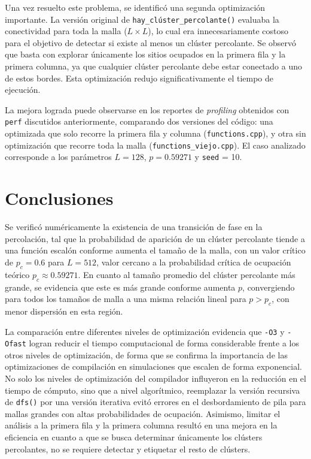 \documentclass[%
 reprint,
 amsmath,amssymb,
 aps,
]{revtex4-2}
\begin{document}
Una vez resuelto este problema, se identificó una segunda optimización importante. La versión original de \texttt{hay\_clúster\_percolante()} evaluaba la conectividad para toda la malla (\( L \times L \)), lo cual era innecesariamente costoso para el objetivo de detectar si existe al menos un clúster percolante. Se observó que basta con explorar únicamente los sitios ocupados en la primera fila y la primera columna, ya que cualquier clúster percolante debe estar conectado a uno de estos bordes. Esta optimización redujo significativamente el tiempo de ejecución.

La mejora lograda puede observarse en los reportes de \textit{profiling} obtenidos con \texttt{perf} discutidos anteriormente, comparando dos versiones del código: una optimizada que solo recorre la primera fila y columna (\texttt{functions.cpp}), y otra sin optimización que recorre toda la malla (\texttt{functions\_viejo.cpp}). El caso analizado corresponde a los parámetros \( L = 128 \), \( p = 0.59271 \) y \texttt{seed} = 10.


\section{Conclusiones}

Se verificó numéricamente la existencia de una transición de fase en la percolación, tal que la probabilidad de aparición de un clúster percolante tiende a una función escalón conforme aumenta el tamaño de la malla, con un valor crítico de $p_c = 0.6$ para $L = 512$, valor cercano a la probabilidad crítica de ocupación teórico $p_c \approx 0.59271$. En cuanto al tamaño promedio del clúster percolante más grande, se evidencia que este es más grande conforme aumenta $p$, convergiendo para todos los tamaños de malla a una misma relación lineal para $p > p_c$, con menor dispersión en esta región.
\vspace{0.2 cm}

La comparación entre diferentes niveles de optimización evidencia que \texttt{-O3} y \texttt{-Ofast} logran reducir el tiempo computacional de forma considerable frente a los otros niveles de optimización, de forma que se confirma la importancia de las optimizaciones de compilación en simulaciones que escalen de forma exponencial. No solo los niveles de optimización del compilador influyeron en la reducción en el tiempo de cómputo, sino que a nivel algorítmico, reemplazar la versión recursiva de \texttt{dfs()} por una versión iterativa evitó errores en el desbordamiento de pila para mallas grandes con altas probabilidades de ocupación. Asimismo, limitar el análisis a la primera fila y la primera columna resultó en una mejora en la eficiencia en cuanto a que se busca determinar únicamente los clústers percolantes, no se requiere detectar y etiquetar el resto de clústers.
\vspace{0.2 cm}
\end{document}
